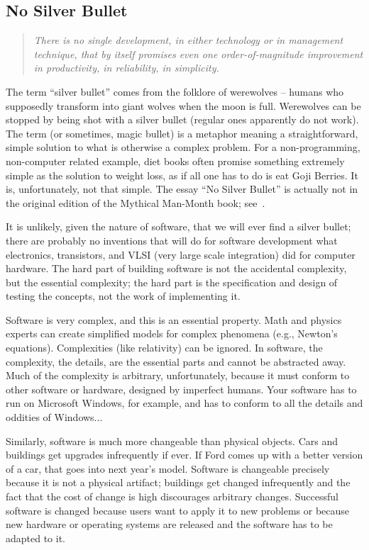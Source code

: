 \subsection*{No Silver Bullet}
\begin{quote}
\textit{There is no single development, in either technology or in management technique, that by itself promises even one order-of-magnitude improvement in productivity, in reliability, in simplicity.}
\end{quote}

The term ``silver bullet'' comes from the folklore of werewolves -- humans who supposedly transform into giant wolves when the moon is full. Werewolves can be stopped by being shot with a silver bullet (regular ones apparently do not work). The term (or sometimes, magic bullet) is a metaphor meaning a straightforward, simple solution to what is otherwise a complex problem. For a non-programming, non-computer related example, diet books often promise something extremely simple as the solution to weight loss, as if all one has to do is eat Goji Berries. It is, unfortunately, not that simple. The essay ``No Silver Bullet'' is actually not in the original edition of the Mythical Man-Month book; see~\cite{nsb}.

It is unlikely, given the nature of software, that we will ever find a silver bullet; there are probably no inventions that will do for software development what electronics, transistors, and VLSI (very large scale integration) did for computer hardware. The hard part of building software is not the accidental complexity, but the essential complexity; the hard part is the specification and design of testing the concepts, not the work of implementing it. 

Software is very complex, and this is an essential property. Math and physics experts can create simplified models for complex phenomena (e.g., Newton's equations). Complexities (like relativity) can be ignored. In software, the complexity, the details, are the essential parts and cannot be abstracted away. Much of the complexity is arbitrary, unfortunately, because it must conform to other software or hardware, designed by imperfect humans. Your software has to run on Microsoft Windows, for example, and has to conform to all the details and oddities of Windows...

Similarly, software is much more changeable than physical objects. Cars and buildings get upgrades infrequently if ever. If Ford comes up with a better version of a car, that goes into next year's model. Software is changeable precisely because it is not a physical artifact; buildings get changed infrequently and the fact that the cost of change is high discourages arbitrary changes. Successful software is changed because users want to apply it to new problems or because new hardware or operating systems are released and the software has to be adapted to it.

